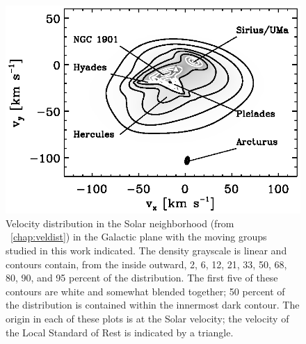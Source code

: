 \clearpage
\begin{figure}
\begin{center}
\includegraphics{figs_groups/veldist.eps}
\caption[Velocity distribution in the Solar neighborhood (from \chaptername~\ref{chap:veldist}) in the Galactic plane with the most prominent moving groups
  indicated]{Velocity distribution in the Solar neighborhood
  (from \chaptername~\ref{chap:veldist}) in the Galactic plane with
  the moving groups studied in this work indicated. The density
  grayscale is linear and contours contain, from the inside outward,
  2, 6, 12, 21, 33, 50, 68, 80, 90, and 95 percent of the
  distribution. The first five of these contours are white and
  somewhat blended together; 50 percent of the distribution is
  contained within the innermost dark contour. The origin in each of
  these plots is at the Solar velocity; the velocity of the Local
  Standard of Rest \citep{2005ApJ...629..268H} is indicated by a
  triangle.}\label{fig:veldist}
\end{center}
\end{figure}

